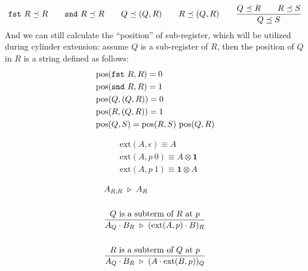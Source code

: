 \begin{definition}
  \begin{gather*}
    \texttt{fst}\ R \preceq R \qquad \texttt{snd}\ R \preceq R \qquad Q \preceq (Q, R) \qquad R \preceq (Q, R)
    \qquad 
    \frac{Q \preceq R \qquad R \preceq S}{Q \preceq S}
  \end{gather*}
  And we can still calculate the ``position'' of sub-register, which will be utilized during cylinder extension: assume $Q$ is a sub-register of $R$, then the position of $Q$ in $R$ is a string defined as follows:
  \begin{align*}
    & \textrm{pos}(\texttt{fst}\ R, R) = 0 \\
    & \textrm{pos}(\texttt{snd}\ R, R) = 1 \\
    & \textrm{pos}(Q, (Q, R)) = 0 \\
    & \textrm{pos}(R, (Q, R)) = 1 \\
    & \textrm{pos}(Q, S) = \textrm{pos}(R, S)\ \textrm{pos}(Q, R)
  \end{align*}
\end{definition}


\begin{definition}
  \begin{align*}
    & \textrm{ext}(A, \epsilon) \equiv A \\
    & \textrm{ext}(A, p\ 0) \equiv A \otimes \mathbf{1} \\
    & \textrm{ext}(A, p\ 1) \equiv \mathbf{1} \otimes A
  \end{align*}
\end{definition}

\begin{align*}
  & A_{R; R} \ \triangleright\  A_{R} \\
  \\
  & \frac{Q \textrm{ is a subterm of } R \textrm{ at } p}{A_{Q} \cdot B_{R} \ \triangleright\  (\textrm{ext}(A, p) \cdot B)_{R}} \\
  \\
  & \frac{R \textrm{ is a subterm of } Q \textrm{ at } p}{A_{Q} \cdot B_{R} \ \triangleright\  (A \cdot \textrm{ext}(B, p))_{Q}} \\
\end{align*}
